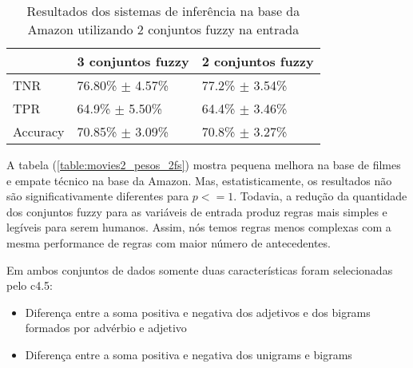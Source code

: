 %
%
%

\begin{table}[!h]
    \begin{tabular}{lll}
    ~         			& 3 conjuntos fuzzy 							& 2 conjuntos fuzzy \\ \hline
    TNR 				& 76.80\% $\pm$ 4.57\%            	& 77.2\% $\pm$ 3.54\%    \\
    TPR    			& 64.9\% $\pm$ 5.50\% 					& 64.4\% $\pm$ 3.46\%   \\
    Accuracy  		& 70.85\% $\pm$ 3.09\%         		& 70.8\% $\pm$ 3.27\%    \\
    \end{tabular}
    \caption{Resultados dos sistemas de inferência na base da Amazon utilizando 2 conjuntos fuzzy na entrada}
	\label{table:amazon2_pesos_2fs}
\end{table}

%
%
%

A tabela (\ref{table:movies2_pesos_2fs}) mostra pequena melhora na base de filmes e empate técnico na base da Amazon. Mas, estatisticamente, os resultados não são significativamente diferentes para $p <= 1$. Todavia, a redução da quantidade dos conjuntos fuzzy para as variáveis de entrada produz regras mais simples e legíveis para serem humanos. Assim, nós temos regras menos complexas com a mesma performance de regras com maior número de antecedentes. 

Em ambos conjuntos de dados somente duas características foram selecionadas pelo c4.5:
\begin{itemize}
\item Diferença entre a soma positiva e negativa dos adjetivos e dos bigrams formados por advérbio e adjetivo
\item Diferença entre a soma positiva e negativa dos unigrams e bigrams
\end{itemize}

